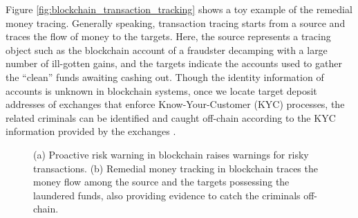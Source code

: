 Figure \ref{fig:blockchain_transaction_tracking} shows a toy example of the remedial money tracing. 
Generally speaking, transaction tracing starts from a source and traces the flow of money to the targets. Here, the source represents a tracing object such as the blockchain account of a fraudster decamping with a large number of ill-gotten gains, and the targets indicate the accounts used to gather the ``clean'' funds awaiting cashing out.
Though the identity information of accounts is unknown in blockchain systems, once we locate target deposit addresses of exchanges that enforce Know-Your-Customer (KYC) processes, the related criminals can be identified and caught off-chain according to the KYC information provided by the exchanges \cite{9332279}.
\begin{figure}[t]
    \centering
    
    \vspace{-0.1in}
    \caption{(a) Proactive risk warning in blockchain raises warnings for risky transactions. %
    (b) Remedial money tracking in blockchain traces the money flow among the source and the targets possessing the laundered funds, also providing evidence to catch the criminals off-chain.}
    \vspace{-0.1in}

\end{figure}

